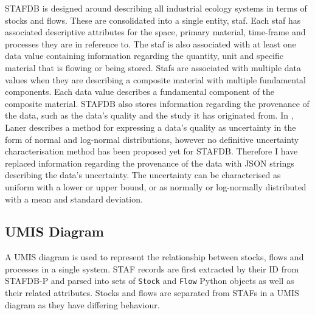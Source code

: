 \documentclass[ %
                    author={Tom Jager},
                supervisor={Dr. Daniel Schien},
                    degree={MEng},
                     title={A Bayesian Inference Engine for Calibrating Uncertainty over UMIS Structured MFA Systems},
                  subtitle={},
                      type={research},
                      year={2019} ]{dissertation}
\begin{document}
STAFDB is designed around describing all industrial ecology systems in terms of stocks and flows. These are consolidated into a single entity, staf. Each staf has associated descriptive attributes for the space, primary material, time-frame and processes they are in reference to. The staf is also associated with at least one data value containing information regarding the quantity, unit and specific material that is flowing or being stored. Stafs are associated with multiple data values when they are describing a composite material with multiple fundamental components. Each data value describes a fundamental component of the composite material. STAFDB also stores information regarding the provenance of the data, such as the data's quality and the study it has originated from. In \cite{laner2014systematic}, Laner describes a method for expressing a data's quality as uncertainty in the form of normal and log-normal distributions, however no definitive uncertainty characterisation method has been proposed yet for STAFDB. Therefore I have replaced information regarding the provenance of the data with JSON strings describing the data's uncertainty. The uncertainty can be characterised as uniform with a lower or upper bound, or as normally or log-normally distributed with a mean and standard deviation.

\subsection{UMIS Diagram}
\label{sec:python_umis_diagram}
A UMIS diagram is used to represent the relationship between stocks, flows and processes in a single system. STAF records are first extracted by their ID from STAFDB-P and parsed into sets of \texttt{Stock} and \texttt{Flow} Python objects as well as their related attributes. Stocks and flows are separated from STAFs in a UMIS diagram as they have differing behaviour.
\end{document}
